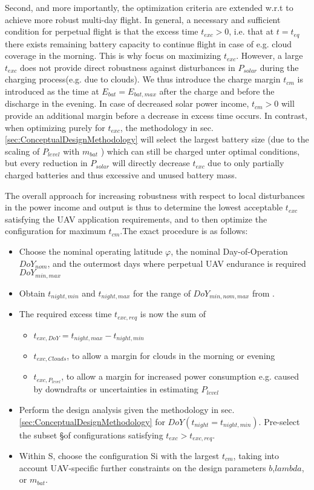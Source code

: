 \documentclass[letterpaper, 10 pt, conference]{ieeeconf}  %
\begin{document}
Second, and more importantly, the optimization criteria are extended w.r.t \cite{Noth_PhD,Leutenegger_JIRS} to achieve more robust multi-day flight. In general, a necessary and sufficient condition for perpetual flight is that the excess time $t_{exc}>0$, i.e. that at $t=t_{eq}$ there exists remaining battery capacity to continue flight in case of e.g. cloud coverage in the morning. This is why\cite{Noth_PhD,Leutenegger_JIRS} focus on maximizing $t_{exc}$. However, a large $t_{exc}$ does not provide direct robustness against disturbances in $P_{solar}$ during the charging process(e.g. due to clouds). We thus introduce the charge margin $t_{cm}$ is introduced as the time at $E_{bat}=E_{bat,max}$ after the charge and before the discharge in the evening. In case of decreased solar power income, $t_{cm}>0$ will provide an additional margin before a decrease in excess time occurs. In contrast, when optimizing purely for $t_{exc}$, the methodology in sec. \ref{sec:ConceptualDesignMethodology} will select the largest battery size (due to the scaling of $P_{level}$ with $m_{bat}$ ) which can still be charged unter optimal conditions, but every reduction in $P_{solar}$ will directly decrease $t_{exc}$ due to only partially charged batteries and thus excessive and unused battery mass. 

The overall approach for increasing robustness with respect to local disturbances in the power income and output is thus to determine the lowest acceptable $t_{exc}$ satisfying the UAV application requirements, and to then optimize the configuration for maximum $t_{cm}$.The exact procedure is as follows:
\begin{itemize}
\item Choose the nominal operating latitude $\varphi$, the nominal Day-of-Operation $DoY_{nom}$, and the outermost days where perpetual UAV endurance is required $DoY_{min,max}$
\item Obtain $t_{night,min}$ and $t_{night,max}$ for the range of $DoY_{min,nom,max}$ from \cite{Duffie_SolarEngineering}. 
\item The required excess time $t_{exc,req}$ is now the sum of 
\begin{itemize}
	\item $t_{exc,DoY} = t_{night,max}-t_{night,min}$
	\item $t_{exc,Clouds}$, to allow a margin for clouds in the morning or evening
	\item $t_{exc,P_{level}}$, to allow a margin for increased power consumption e.g. caused by downdrafts or uncertainties in estimating $P_{level}$
\end{itemize}
\item Perform the design analysis given the methodology in sec. \ref{sec:ConceptualDesignMethodology} for $DoY(t_{night}=t_{night,min})$. Pre-select the subset \S of configurations satisfying $t_{exc}>t_{exc,req}$.
\item Within S, choose the configuration Si with the largest $t_{cm}$, taking into account UAV-specific further constraints on the design parameters $b$,$lambda$, or $m_{bat}$.
\end{itemize}
\end{document}
